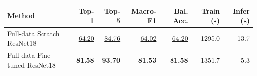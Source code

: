 \begin{tabular}{lrrrrrr}
\toprule
Method & Top-1 & Top-5 & Macro-F1 & Bal. Acc. & Train (s) & Infer (s) \\
\midrule
Full-data Scratch ResNet18 & \underline{64.20} & \underline{84.76} & \underline{64.02} & \underline{64.20} & 1295.0 & 13.7 \\
Full-data Fine-tuned ResNet18 & \textbf{81.58} & \textbf{93.70} & \textbf{81.53} & \textbf{81.58} & 1351.7 & 5.3 \\
\bottomrule
\end{tabular}
